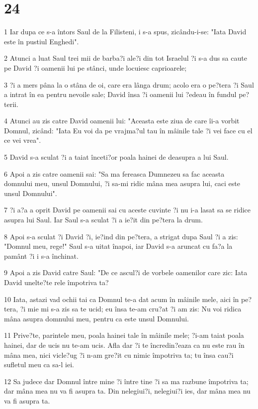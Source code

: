 \chapter{24}

\par 1 Iar dupa ce s-a întors Saul de la Filisteni, i s-a spus, zicându-i-se: "Iata David este în pustiul Enghedi".
\par 2 Atunci a luat Saul trei mii de barba?i ale?i din tot Israelul ?i s-a dus sa caute pe David ?i oamenii lui pe stânci, unde locuiesc caprioarele;
\par 3 ?i a mers pâna la o stâna de oi, care era lânga drum; acolo era o pe?tera ?i Saul a intrat în ea pentru nevoile sale; David însa ?i oamenii lui ?edeau în fundul pe?terii.
\par 4 Atunci au zis catre David oamenii lui: "Aceasta este ziua de care îi-a vorbit Domnul, zicând: "Iata Eu voi da pe vrajma?ul tau în mâinile tale ?i vei face cu el ce vei vrea".
\par 5 David s-a sculat ?i a taiat înceti?or poala hainei de deasupra a lui Saul.
\par 6 Apoi a zis catre oamenii sai: "Sa ma fereasca Dumnezeu sa fac aceasta domnului meu, unsul Domnului, ?i sa-mi ridic mâna mea asupra lui, caci este unsul Domnului".
\par 7 ?i a?a a oprit David pe oamenii sai cu aceste cuvinte ?i nu i-a lasat sa se ridice asupra lui Saul. Iar Saul s-a sculat ?i a ie?it din pe?tera la drum.
\par 8 Apoi s-a sculat ?i David ?i, ie?ind din pe?tera, a strigat dupa Saul ?i a zis: "Domnul meu, rege!" Saul s-a uitat înapoi, iar David s-a aruncat cu fa?a la pamânt ?i i s-a închinat.
\par 9 Apoi a zis David catre Saul: "De ce ascul?i de vorbele oamenilor care zic: Iata David unelte?te rele împotriva ta?
\par 10 Iata, astazi vad ochii tai ca Domnul te-a dat acum în mâinile mele, aici în pe?tera, ?i mie mi s-a zis sa te ucid; eu însa te-am cru?at ?i am zis: Nu voi ridica mâna asupra domnului meu, pentru ca este unsul Domnului.
\par 11 Prive?te, parintele meu, poala hainei tale în mâinile mele; ?i-am taiat poala hainei, dar de ucis nu te-am ucis. Afla dar ?i te încredin?eaza ca nu este rau în mâna mea, nici vicle?ug ?i n-am gre?it cu nimic împotriva ta; tu însa cau?i sufletul meu ca sa-l iei.
\par 12 Sa judece dar Domnul între mine ?i între tine ?i sa ma razbune împotriva ta; dar mâna mea nu va fi asupra ta. Din nelegiui?i, nelegiui?i ies, dar mâna mea nu va fi asupra ta.
